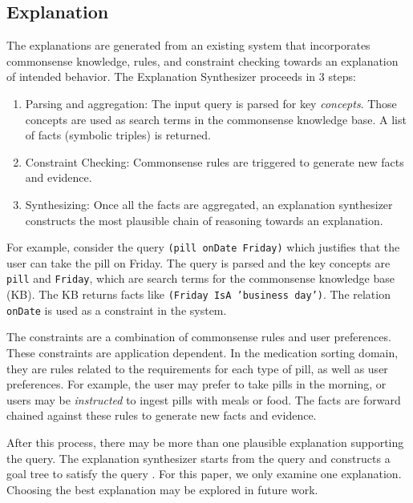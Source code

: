\documentclass[letterpaper]{article} %
\begin{document}
\subsection{Explanation}
The explanations are generated from an existing
system \cite{gilpin2018monitoring,leilanithesis} that incorporates commonsense
knowledge, rules, and constraint checking towards an explanation of
intended behavior.  The Explanation Synthesizer proceeds in 3 steps:
\begin{enumerate}
\item Parsing and aggregation: The input query is parsed for key \emph{concepts}.  Those
concepts are used as search terms in the commonsense knowledge base.  A list of facts (symbolic triples) is returned.
\item Constraint Checking: Commonsense rules are triggered to generate
new facts and evidence.
\item Synthesizing: Once all the facts are aggregated, an explanation
synthesizer constructs the most plausible chain of reasoning
towards an explanation.
\end{enumerate}

For example, consider the query \texttt{(pill onDate Friday)} which justifies that the user can take the pill on Friday.  The query is parsed and
the key concepts are \texttt{pill} and \texttt{Friday}, which are search terms for
the commonsense knowledge base (KB).  The KB returns facts like
\texttt{(Friday IsA 'business day')}.  The relation \texttt{onDate} is
used as a constraint in the system.

The constraints are a combination of commonsense rules and user
preferences.  These constraints are application dependent.   In the
medication sorting domain, they are rules related to the requirements
for each type of pill, as well as user preferences.  For example, the
user may prefer to take pills in the morning, or users may be
\emph{instructed} to ingest pills with meals or food.  The facts are
forward chained against these rules to generate new facts and
evidence.

After this process, there may be more than one plausible explanation
supporting the query.  The explanation synthesizer starts from the
query and constructs a goal tree to satisfy the query
\cite{leilanithesis}.  For this paper, we only examine one
explanation.  Choosing the best explanation may be explored in future
work.
\end{document}
